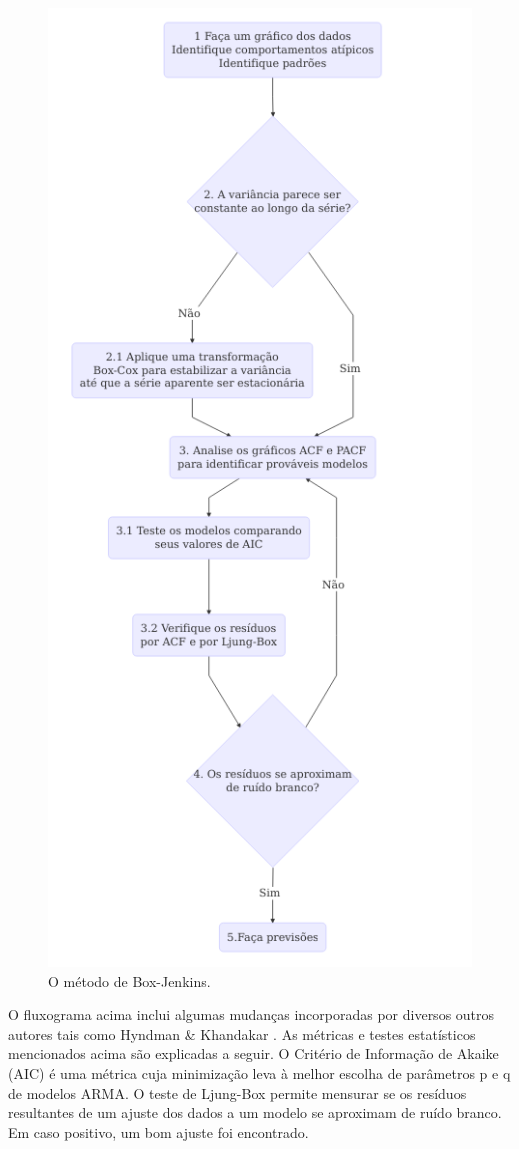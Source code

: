 \documentclass[
	12pt,				%
	openright,			%
	oneside,			%
	a4paper,			%
	english,			%
	french,				%
	spanish,			%
	brazil				%
	]{abntex2}
\begin{document}
\begin{figure}[h]
    \centering
	\includegraphics[scale=0.52]{boxjenkins}
	\caption{O método de Box-Jenkins.}
\end{figure}
\FloatBarrier

O fluxograma acima inclui algumas mudanças incorporadas por diversos outros autores tais como Hyndman \& Khandakar \cite{khandakar}. As métricas e testes estatísticos mencionados acima são explicadas a seguir.
O Critério de Informação de Akaike (AIC) \cite{eike} é uma métrica cuja minimização leva à melhor escolha de parâmetros p e q de modelos ARMA. O teste de Ljung-Box \cite{ljung} permite mensurar se os resíduos resultantes de um ajuste dos dados a um modelo se aproximam de ruído branco. Em caso positivo, um bom ajuste foi encontrado.
\end{document}
